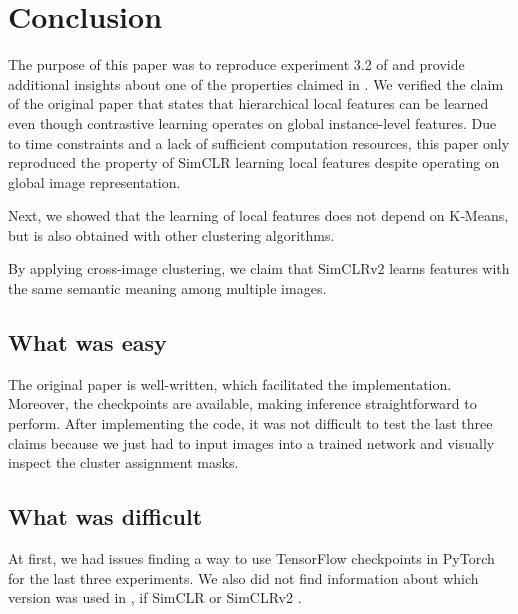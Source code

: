     

\section{Conclusion}

The purpose of this paper was to reproduce experiment 3.2 of \cite{chen2021intriguing} and provide additional insights about one of the properties claimed in \cite{chen2021intriguing}. We verified the claim of the original paper that states that hierarchical local features can be learned even though contrastive learning operates on global instance-level features. Due to time constraints and a lack of sufficient computation resources, this paper only reproduced the property of SimCLR learning local features despite operating on global image representation.

Next, we showed that the learning of local features does not depend on K‐Means, but is also obtained
with other clustering algorithms. 

By applying cross-image clustering, we claim that SimCLRv2 learns features with the same semantic meaning among multiple images.




\subsection{What was easy}
    The original paper is well-written, which facilitated the implementation. Moreover, the checkpoints are available, making inference straightforward to perform. After implementing the code, it was not difficult to test the last three claims because we just had to input images into a trained network and visually inspect the cluster assignment masks.
\subsection{What was difficult}
    At first, we had issues finding a way to use TensorFlow checkpoints in PyTorch for the last three experiments. We also did not find information about which version was used in \cite{chen2021intriguing}, if SimCLR \cite{simclr} or SimCLRv2 \cite{chen2020big}.

